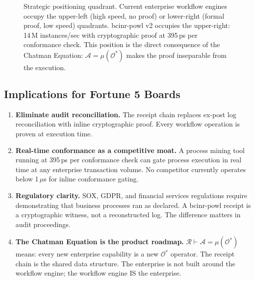 \documentclass[12pt,a4paper]{article}
\theoremstyle{definition}
\theoremstyle{remark}
\newcommand{\Ostar}{\mathcal{O}^{*}}
\newcommand{\Agency}{\mathcal{A}}
\newcommand{\Reality}{\mathcal{R}}
\begin{document}
\begin{figure}[h]
\caption{Strategic positioning quadrant.
Current enterprise workflow engines occupy the upper-left (high speed, no proof)
or lower-right (formal proof, low speed) quadrants.
bcinr-powl v2 occupies the upper-right: 14\,M instances/sec with cryptographic proof
at 395\,ps per conformance check.
This position is the direct consequence of the Chatman Equation:
$\Agency = \mu(\Ostar)$ makes the proof inseparable from the execution.}
\label{fig:quadrant}
\end{figure}

\subsection{Implications for Fortune 5 Boards}

\begin{enumerate}[leftmargin=*, itemsep=4pt]
  \item \textbf{Eliminate audit reconciliation.}
        The receipt chain replaces ex-post log reconciliation with
        inline cryptographic proof. Every workflow operation is proven at execution time.

  \item \textbf{Real-time conformance as a competitive moat.}
        A process mining tool running at 395\,ps per conformance check can gate
        process execution in real time at any enterprise transaction volume.
        No competitor currently operates below 1\,$\mu$s for inline conformance gating.

  \item \textbf{Regulatory clarity.}
        SOX, GDPR, and financial services regulations require demonstrating
        that business processes ran as declared.
        A bcinr-powl receipt is a cryptographic witness, not a reconstructed log.
        The difference matters in audit proceedings.

  \item \textbf{The Chatman Equation is the product roadmap.}
        $\Reality \vdash \Agency = \mu(\Ostar)$ means:
        every new enterprise capability is a new $\Ostar$ operator.
        The receipt chain is the shared data structure.
        The enterprise is not built around the workflow engine;
        the workflow engine IS the enterprise.
\end{enumerate}
\end{document}
